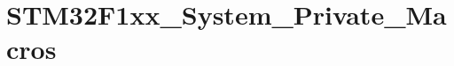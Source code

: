 \hypertarget{group___s_t_m32_f1xx___system___private___macros}{}\section{S\+T\+M32\+F1xx\+\_\+\+System\+\_\+\+Private\+\_\+\+Macros}
\label{group___s_t_m32_f1xx___system___private___macros}
